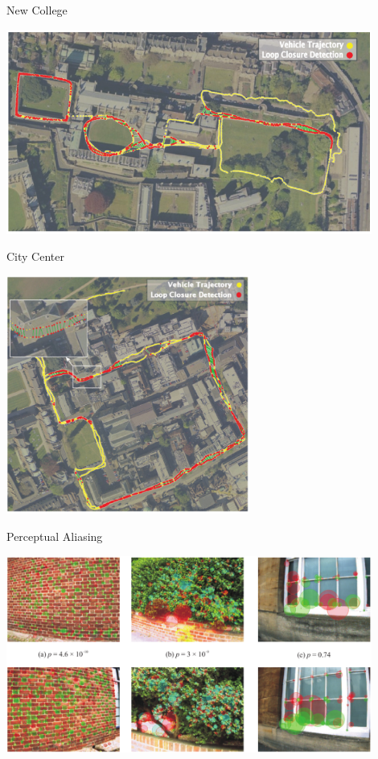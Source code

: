 \begin{frame}{New College}
    \begin{center}
        \includegraphics[width=0.9\textwidth]{./media/new_college.png}
    \end{center}
\end{frame}

\begin{frame}{City Center}
    \begin{center}
        \includegraphics[width=0.6\textwidth]{./media/city_center.png}
    \end{center}
\end{frame}

\begin{frame}{Perceptual Aliasing}
    \begin{center}
        \includegraphics[width=0.9\textwidth]{./media/perceptual_aliasing.png}
    \end{center}
\end{frame}

